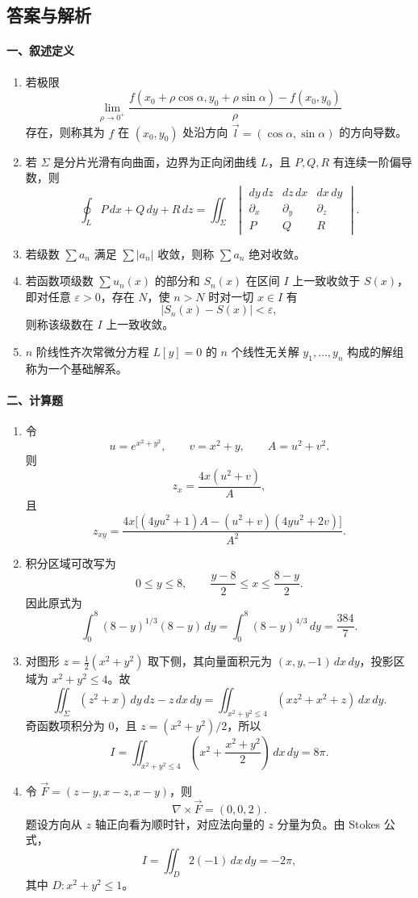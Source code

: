 \subsection{答案与解析}

\paragraph*{一、叙述定义}
\begin{enumerate}
  \item 若极限
  \[
    \lim_{\rho\to0^+}\frac{f(x_0+\rho\cos\alpha,y_0+\rho\sin\alpha)-f(x_0,y_0)}{\rho}
  \]
  存在，则称其为 $f$ 在 $(x_0,y_0)$ 处沿方向 $\vec l=(\cos\alpha,\sin\alpha)$ 的方向导数。
  \item 若 $\Sigma$ 是分片光滑有向曲面，边界为正向闭曲线 $L$，且 $P,Q,R$ 有连续一阶偏导数，则
  \[
    \oint_L P\,dx+Q\,dy+R\,dz
    =
    \iint_\Sigma
    \begin{vmatrix}
      dy\,dz & dz\,dx & dx\,dy\\
      \partial_x & \partial_y & \partial_z\\
      P & Q & R
    \end{vmatrix}.
  \]
  \item 若级数 $\sum a_n$ 满足 $\sum |a_n|$ 收敛，则称 $\sum a_n$ 绝对收敛。
  \item 若函数项级数 $\sum u_n(x)$ 的部分和 $S_n(x)$ 在区间 $I$ 上一致收敛于 $S(x)$，即对任意 $\varepsilon>0$，存在 $N$，使 $n>N$ 时对一切 $x\in I$ 有
  \[
    |S_n(x)-S(x)|<\varepsilon,
  \]
  则称该级数在 $I$ 上一致收敛。
  \item $n$ 阶线性齐次常微分方程 $L[y]=0$ 的 $n$ 个线性无关解 $y_1,\ldots,y_n$ 构成的解组称为一个基础解系。
\end{enumerate}

\paragraph*{二、计算题}
\begin{enumerate}
  \item 令
  \[
    u=e^{x^2+y^2},\qquad v=x^2+y,\qquad A=u^2+v^2.
  \]
  则
  \[
    z_x=\frac{4x(u^2+v)}{A},
  \]
  且
  \[
    z_{xy}=
    \frac{4x\bigl[(4yu^2+1)A-(u^2+v)(4yu^2+2v)\bigr]}{A^2}.
  \]
  \item 积分区域可改写为
  \[
    0\le y\le8,\qquad \frac{y-8}{2}\le x\le\frac{8-y}{2}.
  \]
  因此原式为
  \[
    \int_0^8(8-y)^{1/3}(8-y)\,dy
    =\int_0^8(8-y)^{4/3}\,dy
    =\frac{384}{7}.
  \]
  \item 对图形 $z=\frac12(x^2+y^2)$ 取下侧，其向量面积元为 $(x,y,-1)\,dx\,dy$，投影区域为 $x^2+y^2\le4$。故
  \[
    \iint_\Sigma (z^2+x)\,dy\,dz-z\,dx\,dy
    =
    \iint_{x^2+y^2\le4}(xz^2+x^2+z)\,dx\,dy.
  \]
  奇函数项积分为 $0$，且 $z=(x^2+y^2)/2$，所以
  \[
    I=\iint_{x^2+y^2\le4}\left(x^2+\frac{x^2+y^2}{2}\right)\,dx\,dy=8\pi.
  \]
  \item 令 $\vec F=(z-y,x-z,x-y)$，则
  \[
    \nabla\times\vec F=(0,0,2).
  \]
  题设方向从 $z$ 轴正向看为顺时针，对应法向量的 $z$ 分量为负。由 Stokes 公式，
  \[
    I=\iint_D 2(-1)\,dx\,dy=-2\pi,
  \]
  其中 $D:x^2+y^2\le1$。
\end{enumerate}

